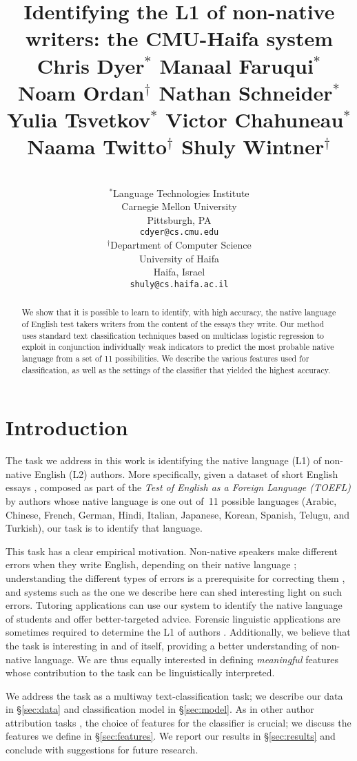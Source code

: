 \documentclass[11pt,letterpaper]{article}
\title{Identifying the L1 of non-native writers: the CMU-Haifa system\\[1em]
{\large Chris Dyer$^\ast$ Manaal Faruqui$^\ast$ Noam Ordan$^\dagger$ Nathan Schneider$^\ast$\\ Yulia Tsvetkov$^\ast$ Victor Chahuneau$^\ast$ Naama Twitto$^\dagger$ Shuly Wintner$^\dagger$}\\[-3em]
}
\author{
\\
$^\ast$Language Technologies Institute\\Carnegie Mellon University\\Pittsburgh, PA\\\texttt{cdyer@cs.cmu.edu}
\And
\\
$^\dagger$Department of Computer Science\\University of Haifa\\Haifa, Israel\\\texttt{shuly@cs.haifa.ac.il}
%
%
%
%
}
\date{}
\newcommand{\Sref}[1]{\S\ref{#1}}
\begin{document}
\maketitle
\begin{abstract}
We show that it is possible to learn to identify, with high accuracy, the native language of English test takers writers from the content of the essays they write.  Our method uses standard text classification
techniques based on multiclass logistic regression to exploit in conjunction individually weak indicators to predict the most probable native language from a set of 11 possibilities. We describe the various features
used for classification, as well as the settings of the classifier
that yielded the highest accuracy.
\end{abstract}

\section{Introduction}
\label{sec:intro}
The task we address in this work is identifying the native language
(L1) of non-native English (L2) authors. More specifically, given a
dataset of short English essays
\citep{blanchard-tetreault-higgins-cahill-chodorow:2013:TOEFL11-RR},
composed as part of the \emph{Test of English as a Foreign Language
  (TOEFL)} by authors whose native language is one out of~11 possible
languages (Arabic, Chinese, French, German, Hindi, Italian, Japanese,
Korean, Spanish, Telugu, and Turkish), our task is to identify that
language.

This task has a clear empirical motivation. Non-native speakers make
different errors when they write English, depending on their native
language \citep{swan2001learner}; understanding the different types of
errors is a prerequisite for correcting them
\citep{Leacock:2010:AGE:1855062}, and systems such as the one we
describe here can shed interesting light on such errors. Tutoring
applications can use our system to identify the native language of
students and offer better-targeted advice. Forensic linguistic
applications are sometimes required to determine the L1 of authors
\citep{estival-gaustad-pham-radford-hutchinson:2007:ALTA2007,estival2007author}. Additionally,
we believe that the task is interesting in and of itself, providing a
better understanding of non-native language. We are thus equally
interested in defining \emph{meaningful} features whose contribution
to the task can be linguistically interpreted.

We address the task as a multiway text-classification task; we describe our data in \Sref{sec:data} and classification model in \Sref{sec:model}. As in other author
attribution tasks \citep{joula:2006}, the choice of features for the
classifier is crucial; we discuss the features we define in
\Sref{sec:features}. We report our results in
\Sref{sec:results} and conclude with suggestions for future
research.
\end{document}

